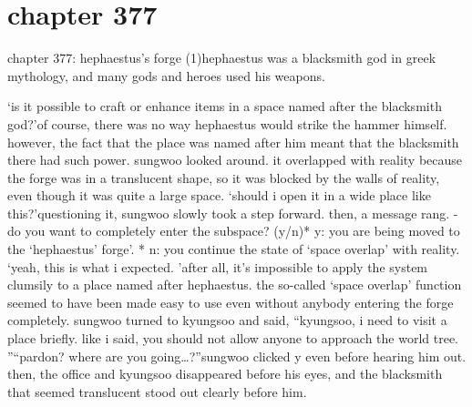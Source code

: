 \section{chapter 377}

chapter 377: hephaestus’s forge (1)hephaestus was a blacksmith god in greek mythology, and many gods and heroes used his weapons.





‘is it possible to craft or enhance items in a space named after the blacksmith god?’of course, there was no way hephaestus would strike the hammer himself.
 however, the fact that the place was named after him meant that the blacksmith there had such power.
sungwoo looked around.
 it overlapped with reality because the forge was in a translucent shape, so it was blocked by the walls of reality, even though it was quite a large space.
‘should i open it in a wide place like this?’questioning it, sungwoo slowly took a step forward.
then, a message rang.
- do you want to completely enter the subspace? (y/n)* y: you are being moved to the ‘hephaestus’ forge’.
* n: you continue the state of ‘space overlap’ with reality.
‘yeah, this is what i expected.
’after all, it’s impossible to apply the system clumsily to a place named after hephaestus.
the so-called ‘space overlap’ function seemed to have been made easy to use even without anybody entering the forge completely.
sungwoo turned to kyungsoo and said, “kyungsoo, i need to visit a place briefly.
 like i said, you should not allow anyone to approach the world tree.
”“pardon? where are you going…?”sungwoo clicked y even before hearing him out.
 then, the office and kyungsoo disappeared before his eyes, and the blacksmith that seemed translucent stood out clearly before him.

